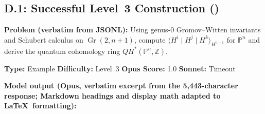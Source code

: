 \subsection*{D.1: Successful Level~3 Construction ()}

\textbf{Problem (verbatim from JSONL):} Using genus-0 Gromov--Witten invariants and Schubert calculus on $\operatorname{Gr}(2, n+1)$, compute $\langle H^i \mid H^j \mid H^k \rangle_{H^{n-1}}$ for $\mathbb{P}^n$ and derive the quantum cohomology ring $QH^*(\mathbb{P}^n, \mathbb{Z})$.

\textbf{Type:} Example \quad \textbf{Difficulty:} Level~3 \quad \textbf{Opus Score:} 1.0 \quad \textbf{Sonnet:} Timeout

\textbf{Model output (Opus, verbatim excerpt from the 5{,}443-character response; Markdown headings and display math adapted to \LaTeX\ formatting):}

